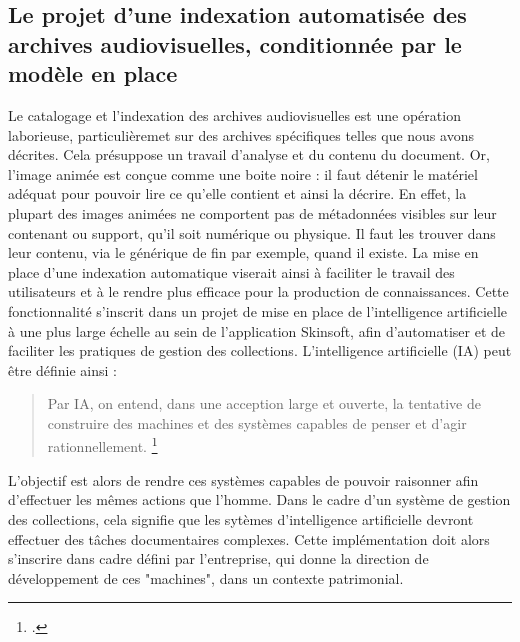 \subsection{Le projet d'une indexation automatisée des archives audiovisuelles, conditionnée par le modèle en place}

Le catalogage et l'indexation des archives audiovisuelles est une opération laborieuse, particulièremet sur des archives spécifiques telles que nous avons décrites. Cela présuppose un travail d'analyse et du contenu du document. Or, l'image animée est conçue comme une boite noire : il faut détenir le matériel adéquat pour pouvoir lire ce qu'elle contient et ainsi la décrire. En effet, la plupart des images animées ne comportent pas de métadonnées visibles sur leur contenant ou support, qu'il soit numérique ou physique. Il faut les trouver dans leur contenu, via le générique de fin par exemple, quand il existe.
La mise en place d'une indexation automatique viserait ainsi à faciliter le travail des utilisateurs et à le rendre plus efficace pour la production de connaissances. Cette fonctionnalité s'inscrit dans un projet de mise en place de l'intelligence artificielle à une plus large échelle au sein de l'application Skinsoft, afin d'automatiser et de faciliter les pratiques de gestion des collections. L'intelligence artificielle (IA) peut être définie ainsi :
\begin{quote}
	Par IA, on entend, dans une acception large et ouverte, la tentative de construire des machines et des systèmes capables de penser et d'agir rationnellement.
	\footcite{zotero-item-584}
\end{quote}

L'objectif est alors de rendre ces systèmes capables de pouvoir raisonner afin d'effectuer les mêmes actions que l'homme. Dans le cadre d'un système de gestion des collections, cela signifie que les sytèmes d'intelligence artificielle devront effectuer des tâches documentaires complexes. Cette implémentation doit alors s'inscrire dans cadre défini par l'entreprise, qui donne la direction de développement de ces "machines", dans un contexte patrimonial.

